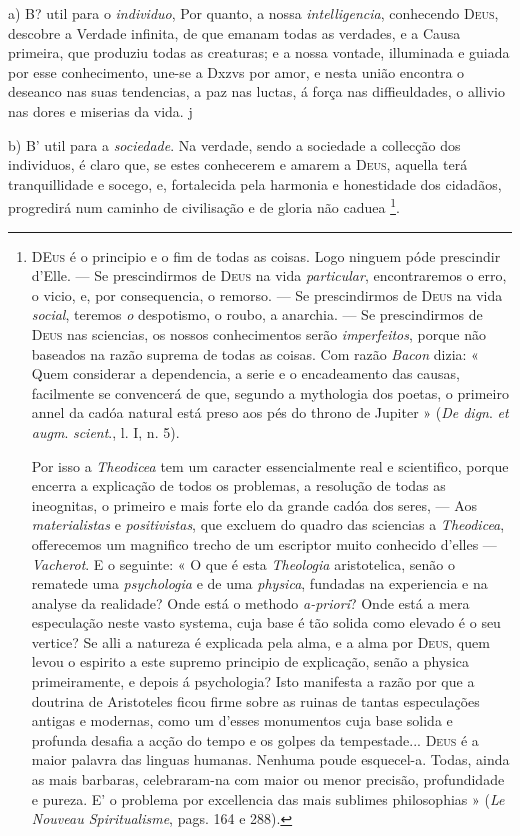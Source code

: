 a) B? util para o \emph{individuo}, Por quanto, a nossa \emph{intelligencia}, conhecendo \textsc{Deus}, descobre a Verdade infinita, de que emanam todas as verdades, e a Causa primeira, que produziu todas as creaturas; e a nossa vontade, illuminada e guiada por esse conhecimento, une-se a Dxzvs por amor, e nesta união encontra o deseanco nas suas tendencias, a paz nas luctas, á força nas diffieuldades, o allivio nas dores e miserias da vida. j

b) B' util para a \emph{sociedade}. Na verdade, sendo a sociedade a collecção dos individuos, é claro que, se estes conhecerem e amarem a \textsc{Deus}, aquella terá tranquillidade e socego, e, fortalecida pela harmonia e honestidade dos cidadãos, progredirá num caminho de civilisação e de gloria não caduea \footnote{\textsc{DEus} é o principio e o fim de todas as coisas. Logo ninguem póde prescindir d'Elle. --- Se prescindirmos de \textsc{Deus} na vida \emph{particular}, encontraremos o erro, o vicio, e, por consequencia, o remorso. --- Se prescindirmos de \textsc{Deus} na vida \emph{social}, teremos \emph{o} despotismo, o roubo, a anarchia. --- Se prescindirmos de \textsc{Deus} nas sciencias, os nossos conhecimentos serão \emph{imperfeitos}, porque não baseados na razão suprema de todas as coisas. Com razão \emph{Bacon} dizia: « Quem considerar a dependencia, a serie e o encadeamento das causas, facilmente se convencerá de que, segundo a mythologia dos poetas, o primeiro annel da cadóa natural está preso aos pés do throno de Jupiter » (\emph{De dign}. \emph{et augm}. \emph{scient}., l. I, n. 5).\par Por isso a \emph{Theodicea} tem um caracter essencialmente real e scientifico, porque encerra a explicação de todos os problemas, a resolução de todas as ineognitas, o primeiro e mais forte elo da grande cadóa dos seres, --- Aos \emph{materialistas} e \emph{positivistas}, que excluem do quadro das sciencias a \emph{Theodicea}, offerecemos um magnifico trecho de um escriptor muito conhecido d'elles --- \emph{Vacherot}. E o seguinte: « O que é esta \emph{Theologia} aristotelica, senão o rematede uma \emph{psychologia} e de uma \emph{physica}, fundadas na experiencia e na analyse da realidade? Onde está o methodo \emph{a-priori}? Onde está a mera especulação neste vasto systema, cuja base é tão solida como elevado é o seu vertice? Se alli a natureza é explicada pela alma, e a alma por \textsc{Deus}, quem levou o espirito a este supremo principio de explicação, senão a physica primeiramente, e depois á psychologia? Isto manifesta a razão por que a doutrina de Aristoteles ficou firme sobre as ruinas de tantas especulações antigas e modernas, como um d'esses monumentos cuja base solida e profunda desafia a acção do tempo e os golpes da tempestade... \textsc{Deus} é a maior palavra das linguas humanas. Nenhuma poude esquecel-a. Todas, ainda as mais barbaras, celebraram-na com maior ou menor precisão, profundidade e pureza. E' o problema por excellencia das mais sublimes philosophias » (\emph{Le Nouveau Spiritualisme}, pags. 164 e 288).}.

